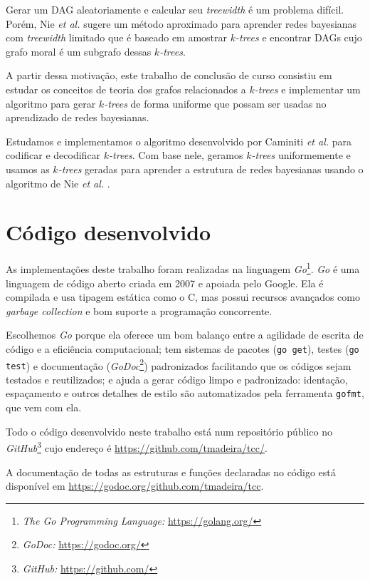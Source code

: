 Gerar um DAG aleatoriamente e calcular seu \emph{treewidth} é um problema difícil. Porém, Nie \emph{et al.} \cite{maua} sugere um método aproximado para aprender redes bayesianas com \emph{treewidth} limitado que é baseado em amostrar \emph{$k$-trees} e encontrar DAGs cujo grafo moral é um subgrafo dessas \emph{$k$-trees}.

A partir dessa motivação, este trabalho de conclusão de curso consistiu em estudar os conceitos de teoria dos grafos relacionados a \emph{$k$-trees} e implementar um algoritmo para gerar \emph{$k$-trees} de forma uniforme que possam ser usadas no aprendizado de redes bayesianas.

Estudamos e implementamos o algoritmo desenvolvido por Caminiti \emph{et al.} \cite{caminiti} para codificar e decodificar \emph{$k$-trees}. Com base nele, geramos \emph{$k$-trees} uniformemente e usamos as \emph{$k$-trees} geradas para aprender a estrutura de redes bayesianas usando o algoritmo de Nie \emph{et al.} \cite{maua}.

\section{Código desenvolvido}

As implementações deste trabalho foram realizadas na linguagem \emph{Go}\footnote{\emph{The Go Programming Language:} \url{https://golang.org/}}. \emph{Go} é uma linguagem de código aberto criada em 2007 e apoiada pelo Google. Ela é compilada e usa tipagem estática como o C, mas possui recursos avançados como \emph{garbage collection} e bom suporte a programação concorrente.

Escolhemos \emph{Go} porque ela oferece um bom balanço entre a agilidade de escrita de código e a eficiência computacional; tem sistemas de pacotes ({\tt go get}), testes ({\tt go test}) e documentação (\emph{GoDoc}\footnote{\emph{GoDoc:} \url{https://godoc.org/}}) padronizados facilitando que os códigos sejam testados e reutilizados; e ajuda a gerar código limpo e padronizado: identação, espaçamento e outros detalhes de estilo são automatizados pela ferramenta {\tt gofmt}, que vem com ela.

Todo o código desenvolvido neste trabalho está num repositório público no \emph{GitHub}\footnote{\emph{GitHub:} \url{https://github.com/}} cujo endereço é \url{https://github.com/tmadeira/tcc/}.

A documentação de todas as estruturas e funções declaradas no código está disponível em \url{https://godoc.org/github.com/tmadeira/tcc}.

